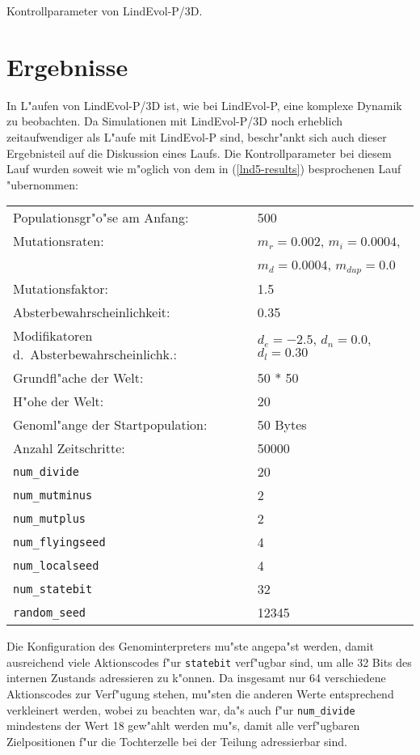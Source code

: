 \begin{table}[tb]
\caption{\label{lnd5x-controlparams}
Kontrollparameter von LindEvol-P/3D.
}
\end{table}

\section{Ergebnisse}

In L"aufen von LindEvol-P/3D ist, wie bei LindEvol-P, eine komplexe Dynamik zu beobachten. Da Simulationen mit LindEvol-P/3D
noch erheblich zeitaufwendiger als L"aufe mit LindEvol-P sind, beschr"ankt sich auch dieser Ergebnisteil auf die
Diskussion eines Laufs. Die Kontrollparameter bei diesem Lauf  wurden soweit wie m"oglich
von dem in (\ref{lnd5-results}) besprochenen Lauf  "ubernommen:

\medskip
\begin{tabular}{ll}
Populationsgr"o"se am Anfang: & 500 \\
Mutationsraten: & $m_r=0.002$, $m_i=0.0004$, \\
		& $m_d=0.0004$, $m_{\mathit{dup}}=0.0$ \\
Mutationsfaktor: & 1.5 \\
Absterbewahrscheinlichkeit: & 0.35 \\
Modifikatoren d.\ Absterbewahrscheinlichk.: & $d_e=-2.5$, $d_n=0.0$, $d_l=0.30$ \\
Grundfl"ache der Welt: & 50 * 50 \\
H"ohe der Welt: & 20 \\
Genoml"ange der Startpopulation: & 50 Bytes \\
Anzahl Zeitschritte:             & 50000 \\
\verb|num_divide| & 20 \\
\verb|num_mutminus| & 2 \\
\verb|num_mutplus| & 2 \\
\verb|num_flyingseed| & 4 \\
\verb|num_localseed| & 4 \\
\verb|num_statebit| & 32 \\
\verb|random_seed| & 12345 \\
\end{tabular}
\medskip

Die Konfiguration des Genominterpreters mu"ste angepa"st werden, damit ausreichend viele Aktionscodes f"ur
\verb|statebit| verf"ugbar sind, um alle 32 Bits des internen Zustands adressieren zu k"onnen. Da insgesamt nur
64 verschiedene Aktionscodes zur Verf"ugung stehen, mu"sten die anderen Werte entsprechend verkleinert werden,
wobei zu beachten war, da"s auch f"ur \verb|num_divide| mindestens der Wert 18 gew"ahlt werden mu"s, damit
alle verf"ugbaren Zielpositionen f"ur die Tochterzelle bei der Teilung adressierbar sind.

